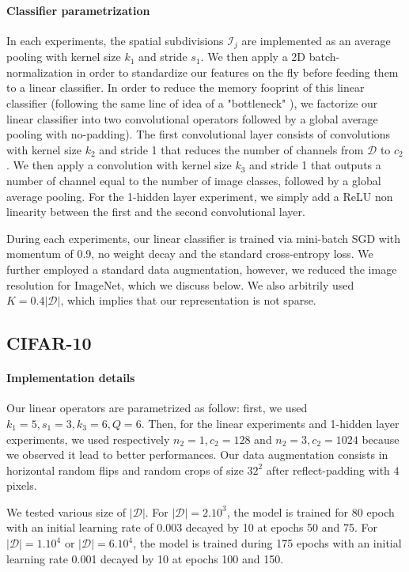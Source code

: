 \documentclass{article}
\begin{document}
\paragraph{Classifier parametrization} In each experiments, the spatial subdivisions $\mathcal{I}_j$ are implemented as an average pooling with kernel size $k_1$ and stride $s_1$.
We then apply a 2D batch-normalization \citep{ioffe2015batch} in order to standardize our features on the fly before feeding them to a linear classifier.
In order to reduce the memory fooprint of this linear classifier (following the same line of idea of a "bottleneck" \cite{he2016deep}), we factorize our linear classifier into two convolutional operators followed by a global average pooling with no-padding).  The first convolutional layer  consists of  convolutions with kernel size $k_2$ and stride 1 that reduces the number of channels from $\mathcal{D}$ to $c_2$. 
We then apply a  convolution with kernel size $k_3$ and stride 1 that outputs a number of channel equal to the number of image classes, followed by a global average pooling.
For the 1-hidden layer experiment, we simply add a ReLU non linearity between the first and the second convolutional layer.

During each experiments,  our linear classifier is trained via mini-batch SGD with momentum of 0.9, no weight decay and the standard cross-entropy loss. We further employed a standard data augmentation, however, we reduced the image resolution for ImageNet, which we discuss below. We also arbitrily used $K=0.4 |\mathcal{D}|$, which implies that our representation is not sparse.



\subsection{CIFAR-10}

 \paragraph{Implementation details} Our linear operators are parametrized as follow: first, we used $k_1=5,s_1=3,k_3=6,Q=6$.
 Then, for the linear experiments and 1-hidden layer experiments, we used respectively $n_2=1, c_2=128$ and  $ n_2=3,c_2=1024$ because we observed it lead to better performances.
Our data augmentation consists in horizontal random flips and random crops of size $32^2$ after  reflect-padding with $4$ pixels.

We tested various size of $|\mathcal{D}|$. For $|\mathcal{D}|=2. 10^3$, the model is trained for 80 epoch with an initial learning rate of 0.003 decayed by 10 at epochs 50 and 75.
For  $|\mathcal{D}|=1.10^4$ or $|\mathcal{D}|=6. 10^4$, the model is trained during 175 epochs with an initial learning rate 0.001 decayed by 10 at epochs 100 and  150. 
\end{document}
